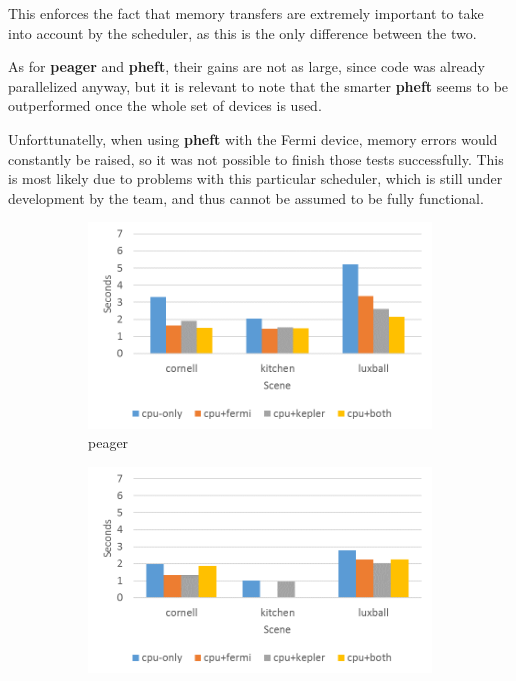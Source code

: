\documentclass[main.tex]{subfiles}
\begin{document}
This enforces the fact that memory transfers are extremely important to take into account by the scheduler, as this is the only difference between the two.

As for \textbf{peager} and \textbf{pheft}, their gains are not as large, since \cpu code was already parallelized anyway, but it is relevant to note that the smarter \textbf{pheft} seems to be outperformed once the whole set of devices is used.

Unforttunatelly, when using \textbf{pheft} with the Fermi device, memory errors would constantly be raised, so it was not possible to finish those tests successfully. This is most likely due to problems with this particular scheduler, which is still under development by the \starpu team, and thus cannot be assumed to be fully functional.

\begin{figure}[!htp]
  \centering
  \begin{subfigure}{.5\textwidth}
    \centering
    \includegraphics[width=\linewidth]{profiling/starpu_sched_peager}
    \caption{peager \label{fig:prof:starpu_sched_peager}}
  \end{subfigure}%
  \begin{subfigure}{.5\textwidth}
    \centering
    \includegraphics[width=\linewidth]{profiling/starpu_sched_pheft}

\end{subfigure}
\end{figure}
\end{document}
